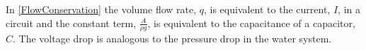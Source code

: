 In \eqref{FlowConservation} the volume flow rate, $q$, is equivalent to the current, $I$, in a circuit and the constant term, $\frac{A}{\rho g}$, is equivalent to the capacitance of a capacitor, $C$. The voltage drop is analogous to the pressure drop in the water system.




%
%
%
%
%
% 
%
%
%
